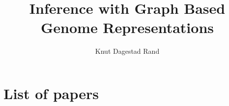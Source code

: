 \documentclass[]{uiophd}
\title{Inference with Graph Based Genome Representations}
\author{Knut Dagestad Rand}
\begin{document}
\frontmatter
\maketitle

\chapter*{List of papers}

\tableofcontents

\mainmatter




\end{document}

